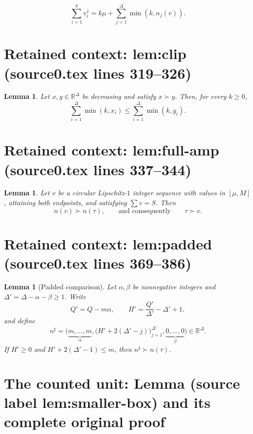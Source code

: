 \documentclass[10pt,a4paper]{amsart}
\newcommand{\R}{\mathbb{R}}
\theoremstyle{plain}
\newtheorem{lemma}[theorem]{Lemma}
\theoremstyle{definition}
\begin{document}
\begin{equation}\label{eq:layer}
\sum_{i=1}^kv_i^\downarrow
=k\mu+\sum_{j=1}^\Delta\min(k,n_j(v)).
\end{equation}


\section*{Retained context: lem:clip (source0.tex lines 319--326)}

\begin{lemma}\label{lem:clip}
Let $x,y\in\R^\Delta$ be decreasing and satisfy $x\succ y$. Then, for every $k\ge0$,
\[
\sum_{i=1}^\Delta\min(k,x_i)
\le
\sum_{i=1}^\Delta\min(k,y_i).
\]
\end{lemma}


\section*{Retained context: lem:full-amp (source0.tex lines 337--344)}

\begin{lemma}\label{lem:full-amp}
Let $v$ be a circular Lipschitz-$1$ integer sequence with values in $[\mu,M]$, attaining both endpoints, and satisfying $\sum v=S$. Then
\[
n(v)\succ n(\tau),
\qquad\text{and consequently}\qquad
\tau\succ v.
\]
\end{lemma}


\section*{Retained context: lem:padded (source0.tex lines 369--386)}

\begin{lemma}[Padded comparison]\label{lem:padded}
Let $\alpha,\beta$ be nonnegative integers and $\Delta'=\Delta-\alpha-\beta\ge1$. Write
\[
Q'=Q-m\alpha,
\qquad
H'=\frac{Q'}{\Delta'}-\Delta'+1,
\]
and define
\[
n^\sharp
=\bigl(
\underbrace{m,\dots,m}_{\alpha},
\bigl(H'+2(\Delta'-j)\bigr)_{j=1}^{\Delta'},
\underbrace{0,\dots,0}_{\beta}
\bigr)\in\R^\Delta.
\]
If $H'\ge0$ and $H'+2(\Delta'-1)\le m$, then $n^\sharp\succ n(\tau)$.
\end{lemma}


\section{The counted unit: Lemma (source label lem:smaller-box) and its complete original proof}
\end{document}
